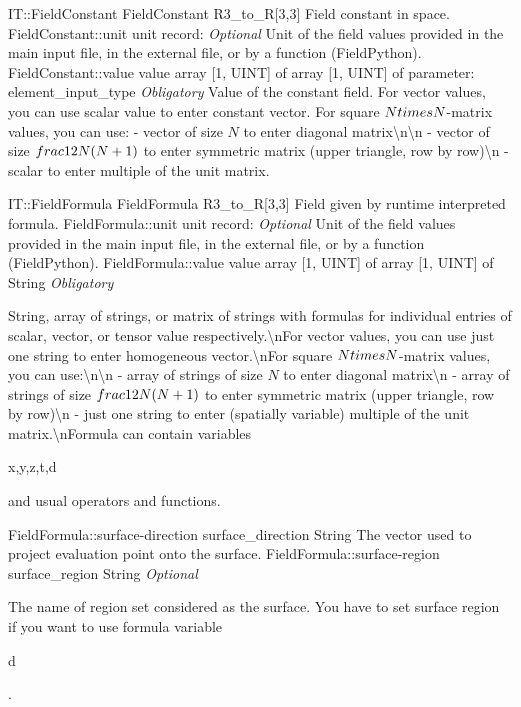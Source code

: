 \begin{RecordType}
	{IT::FieldConstant}
	{FieldConstant}
	{}%
	{}%
	{{{R3{\_}to{\_}R[3,3] Field constant in space.}%
}}
		\RecKey
			{FieldConstant::unit}
			{unit}
			{{record: }}{}
			{ \it{Optional}}
			{{{Unit of the field values provided in the main input file, in the external file, or by a function (FieldPython).}%
}}
		\RecKey
			{FieldConstant::value}
			{value}
			{{array [1, UINT] of }{array [1, UINT] of }{parameter: element{\_}input{\_}type}}{}
			{ \it{Obligatory}}
			{{{Value of the constant field.
For vector values, you can use scalar value to enter constant vector.
For square }{$N\\times N$}{-matrix values, you can use:  - vector of size }{$N$}{ to enter diagonal matrix{\textbackslash}n{\textbackslash}n - vector of size }{$\\frac12N(N+1)$}{ to enter symmetric matrix (upper triangle, row by row){\textbackslash}n - scalar to enter multiple of the unit matrix.}%
}}
\end{RecordType}
\begin{RecordType}
	{IT::FieldFormula}
	{FieldFormula}
	{}%
	{}%
	{{{R3{\_}to{\_}R[3,3] Field given by runtime interpreted formula.}%
}}
		\RecKey
			{FieldFormula::unit}
			{unit}
			{{record: }}{}
			{ \it{Optional}}
			{{{Unit of the field values provided in the main input file, in the external file, or by a function (FieldPython).}%
}}
		\RecKey
			{FieldFormula::value}
			{value}
			{{array [1, UINT] of }{array [1, UINT] of }{String}}{}
			{ \it{Obligatory}}
			{{{String, array of strings, or matrix of strings with formulas for individual entries of scalar, vector, or tensor value respectively.{\textbackslash}nFor vector values, you can use just one string to enter homogeneous vector.{\textbackslash}nFor square }{$N\\times N$}{-matrix values, you can use:{\textbackslash}n{\textbackslash}n - array of strings of size }{$N$}{ to enter diagonal matrix{\textbackslash}n - array of strings of size }{$\\frac12N(N+1)$}{ to enter symmetric matrix (upper triangle, row by row){\textbackslash}n - just one string to enter (spatially variable) multiple of the unit matrix.{\textbackslash}nFormula can contain variables }\begin{ttfamily}x,y,z,t,d\end{ttfamily}{ and usual operators and functions.}%
}}
		\RecKey
			{FieldFormula::surface-direction}
			{surface{\_}direction}
			{{String}}{}
			{ }
			{{{The vector used to project evaluation point onto the surface.}%
}}
		\RecKey
			{FieldFormula::surface-region}
			{surface{\_}region}
			{{String}}{}
			{ \it{Optional}}
			{{{The name of region set considered as the surface.
You have to set surface region if you want to use formula variable }\begin{ttfamily}d\end{ttfamily}{.}%
}}
\end{RecordType}
